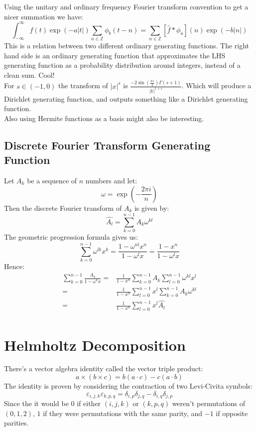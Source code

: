 Using the unitary and ordinary frequency Fourier transform convention to get a nicer summation we have:
\[\int_{-\infty}^{\infty}f(t)\exp(-a|t|)\sum_{n\in\mathbb{Z}}\phi_b(t-n) = \sum_{n\in\mathbb{Z}}[\hat{f}\ast\phi_a](n)\exp(-b|n|)\]
This is a relation between two different ordinary generating functions.
The right hand side is an ordinary generating function that approximates the LHS generating function as a probability distribution around integers, instead of a clean sum. Cool!
\\

For $s \in (-1,0)$ the transform of $|x|^s$  is $\frac{-2\sin(\frac{\pi s}{2})\Gamma(s+1)}{|k|^{1+s}}$.
Which will produce a Dirichlet generating function, and outputs something like a Dirichlet generating function.
\\

Also using Hermite functions as a basis might also be interesting.

\subsection{Discrete Fourier Transform Generating Function}
Let $A_k$ be a sequence of $n$ numbers and let:
\[\omega = \exp\left(-\frac{2\pi i }{n}\right)\]
Then the discrete Fourier transform of $A_k$ is given by:
\[\widehat{A_l} = \sum_{k=0}^{n-1}A_k\omega^{kl}\]
The geometric progression formula gives us:
\[\sum_{k=0}^{n-1}\omega^{lk}x^k = \frac{1-\omega^{nl}x^n}{1-\omega^l x}=\frac{1-x^n}{1-\omega^l x}\]
Hence:
\begin{equation*}
\begin{aligned}
	\sum_{k=0}^{n-1}\frac{A_k}{1-\omega^k x} =&\frac{1}{1-x^n}\sum_{k=0}^{n-1}A_k\sum_{l=0}^{n-1}\omega^{kl}x^l \\
	=&\frac{1}{1-x^n}\sum_{l=0}^{n-1}x^l\sum_{k=0}^{n-1}A_k\omega^{kl} \\
	=&\frac{1}{1-x^n}\sum_{l=0}^{n-1}x^l\widehat{A_l} \\
\end{aligned}
\end{equation*}

\section{Helmholtz Decomposition}
There's a vector algebra identity called the vector triple product:
\[a\times(b\times c) = b(a\cdot c)-c(a\cdot b)\]
The identity is proven by considering the contraction of two Levi-Civita symbols:
\[\varepsilon_{i,j,k}\varepsilon_{k,p,q} = \delta_{i,p}\delta_{j,q}-\delta_{i,q}\delta_{j,p}\]
Since the it would be $0$ if either $(i,j,k)$ or $(k,p,q)$ weren't permutations of $(0,1,2)$,
$1$ if they were permutations with the same parity, and $-1$ if opposite parities.
\\

